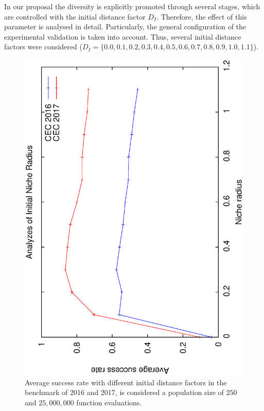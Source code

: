 In our proposal the diversity is explicitly promoted through several stages, which are controlled with the initial distance factor $D_I$.
%
Therefore, the effect of this parameter is analysed in detail.
%
Particularly, the general configuration of the experimental validation is taken into account.
%
Thus, several initial distance factors were considered ($D_I = \{0.0, 0.1, 0.2, 0.3, 0.4, 0.5, 0.6, 0.7, 0.8, 0.9, 1.0, 1.1 \}$).
%
\begin{figure}[t]
\centering
  \includegraphics[scale=0.3, angle=-90]{img/ED/Tuning_CEC.eps}
\caption{Average success rate with different initial distance factors in the benchmark of \CEC{} 2016 and \CEC{} 2017, is considered a population size of $250$ and $25,000,000$ function evaluations.}
\label{fig:one}
\end{figure}

